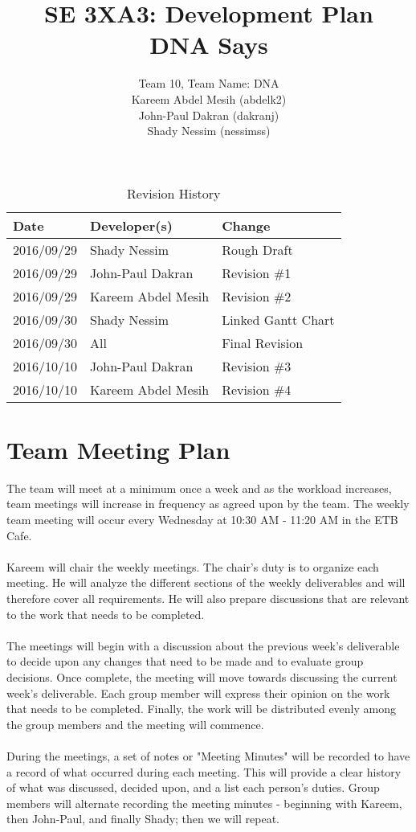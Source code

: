 \documentclass{article}
\title{SE 3XA3: Development Plan\\DNA Says}
\author{Team 10, Team Name: DNA
		\\ Kareem Abdel Mesih (abdelk2)
		\\ John-Paul Dakran (dakranj)
		\\ Shady Nessim (nessimss)
}
\date{}
\begin{document}
\begin{table}[hp]
\caption{Revision History} \label{TblRevisionHistory}
\begin{tabularx}{\textwidth}{llX}
\toprule
\textbf{Date} & \textbf{Developer(s)} & \textbf{Change}\\
\midrule
2016/09/29 & Shady Nessim & Rough Draft\\
2016/09/29 & John-Paul Dakran &  Revision \#1\\
2016/09/29 & Kareem Abdel Mesih &  Revision \#2\\
2016/09/30 & Shady Nessim & Linked Gantt Chart\\
2016/09/30 & All & Final Revision\\
2016/10/10 & John-Paul Dakran & Revision \#3\\
2016/10/10 & Kareem Abdel Mesih & Revision \#4\\
\bottomrule
\end{tabularx}
\end{table}
\newpage
\maketitle
\newpage
\section{Team Meeting Plan} 
The team will meet at a minimum once a week and as the workload increases, team meetings will increase in frequency as agreed upon by the team. The weekly team meeting will occur every Wednesday at 10:30 AM - 11:20 AM in the ETB Cafe.\\
\\
\indent Kareem will chair the weekly meetings. The chair's duty is to organize each meeting. He will analyze the different sections of the weekly deliverables and will therefore cover all requirements. He will also prepare discussions that are relevant to the work that needs to be completed.\\
\\
\indent The meetings will begin with a discussion about the previous week's deliverable to decide upon any changes that need to be made and to evaluate group decisions. Once complete, the meeting will move towards discussing the current week's deliverable. Each group member will express their opinion on the work that needs to be completed. Finally, the work will be distributed evenly among the group members and the meeting will commence.\\
\\
\indent During the  meetings, a set of notes or "Meeting Minutes" will be recorded to have a record of what occurred during each meeting. This will provide a clear history of what was discussed, decided upon, and a list each person's duties. Group members will alternate recording the meeting minutes - beginning with Kareem, then John-Paul, and finally Shady; then we will repeat.
\end{document}
